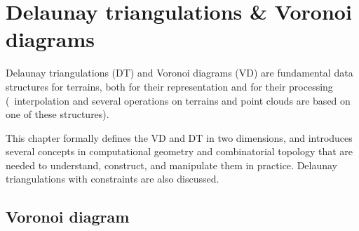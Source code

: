 
\setchapterpreamble[u]{\margintoc}
\graphicspath{{dtvd/}}


\newcommand{\Orient}{O\textsc{rientation}\xspace}
\newcommand{\walk}{W\textsc{alk}\xspace}
\newcommand{\Incircle}{I\textsc{n}C\textsc{ircle}\xspace}

\chapter{Delaunay triangulations \& Voronoi diagrams}%
\label{chap:dtvd}

Delaunay triangulations (DT) and Voronoi diagrams (VD) are fundamental data structures for terrains, both for their representation and for their processing (\eg\ interpolation and several operations on terrains and point clouds are based on one of these structures).

%

This chapter formally defines the VD and DT in two dimensions, and introduces several concepts in computational geometry and combinatorial topology that are needed to understand, construct, and manipulate them in practice. 
Delaunay triangulations with constraints are also discussed.


\section{Voronoi diagram}%
\label{sec:vd}%

